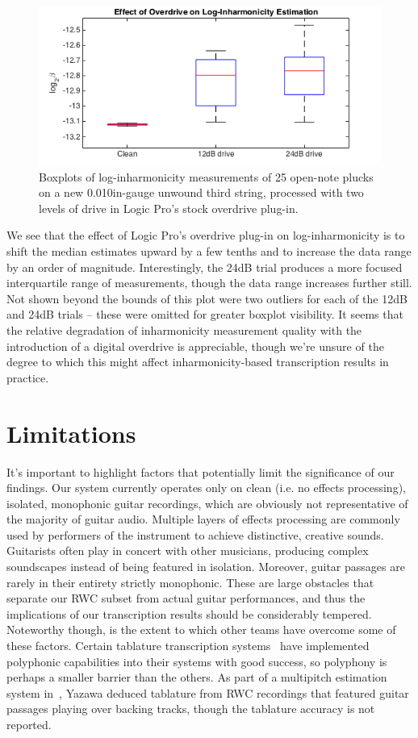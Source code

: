 \documentclass[12pt]{cmuthesis}
\begin{document}
\begin{figure}[!htbp] 
\centering
\includegraphics[scale=0.6]{eg-params-od}
\caption{Boxplots of log-inharmonicity measurements of 25 open-note plucks on a new 0.010in-gauge unwound third string, processed with two levels of drive in Logic Pro's stock overdrive plug-in.}
\label{fig:eg-params-od}
\end{figure} 

We see that the effect of Logic Pro's overdrive plug-in on log-inharmonicity is to shift the median estimates upward by a few tenths and to increase the data range by an order of magnitude. Interestingly, the 24dB trial produces a more focused interquartile range of measurements, though the data range increases further still. Not shown beyond the bounds of this plot were two outliers for each of the 12dB and 24dB trials -- these were omitted for greater boxplot visibility. It seems that the relative degradation of inharmonicity measurement quality with the introduction of a digital overdrive is appreciable, though we're unsure of the degree to which this might affect inharmonicity-based transcription results in practice.

\section{Limitations}
It's important to highlight factors that potentially limit the significance of our findings. Our system currently operates only on clean (i.e. no effects processing), isolated, monophonic guitar recordings, which are obviously not representative of the majority of guitar audio. Multiple layers of effects processing are commonly used by performers of the instrument to achieve distinctive, creative sounds. Guitarists often play in concert with other musicians, producing complex soundscapes instead of being featured in isolation. Moreover, guitar passages are rarely in their entirety strictly monophonic. These are large obstacles that separate our RWC subset from actual guitar performances, and thus the implications of our transcription results should be considerably tempered. Noteworthy though, is the extent to which other teams have overcome some of these factors. Certain tablature transcription systems~\cite{barbanchoi2012,abesser2012,dittmar2013,kehling2014} have implemented polyphonic capabilities into their systems with good success, so polyphony is perhaps a smaller barrier than the others. As part of a multipitch estimation system in~\cite{yazawa2013}, Yazawa deduced tablature from RWC recordings that featured guitar passages playing over backing tracks, though the tablature accuracy is not reported.
\end{document}

